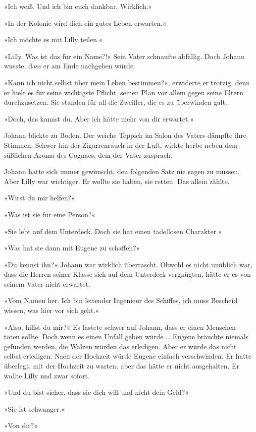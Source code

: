 »Ich weiß. Und ich bin euch dankbar. Wirklich.«

»In der Kolonie wird dich ein gutes Leben erwarten.«

»Ich möchte es mit Lilly teilen.«

»Lilly. Was ist das für ein Name?!« Sein Vater schnaufte abfällig.
Doch Johann wusste, dass er am Ende nachgeben würde.

»Kann ich nicht selbst über mein Leben bestimmen?«, erwiderte er
trotzig, denn er hielt es für seine wichtigste Pflicht, seinen Plan
vor allem gegen seine Eltern durchzusetzen. Sie standen für all die
Zweifler, die es zu überwinden galt.

»Doch, das kannst du. Aber ich hätte mehr von dir erwartet.«

Johann blickte zu Boden. Der weiche Teppich im Salon des Vaters
dämpfte ihre Stimmen. Schwer hin der Zigarrenrauch in der Luft,
wirkte herbe neben dem süßlichen Aroma des Cognacs, dem der Vater
zusprach.

Johann hatte sich immer gewünscht, den folgenden Satz nie sagen zu
müssen. Aber Lilly war wichtiger. Er wollte sie haben, sie retten.
Das allein zählte.

»Wirst du mir helfen?«

»Was ist sie für eine Person?«

»Sie lebt auf dem Unterdeck. Doch sie hat einen tadellosen
Charakter.«

»Was hat sie dann mit Eugene zu schaffen?«

»Du kennst ihn?« Johann war wirklich überrascht. Obwohl es nicht
unüblich war, dass die Herren seiner Klasse sich auf dem Unterdeck
vergnügten, hätte er es von seinem Vater nicht erwartet.

»Vom Namen her. Ich bin leitender Ingenieur des Schiffes, ich muss
Bescheid wissen, was hier vor sich geht.«

»Also, hilfst du mir?« Es lastete schwer auf Johann, dass er einen
Menschen töten sollte. Doch wenn es einen Unfall geben würde \ldots{}
Eugene bräuchte niemals gefunden werden, die Walzen würden das
erledigen. Aber er würde das nicht selbst erledigen. Nach der
Hochzeit würde Eugene einfach verschwinden. Er hatte überlegt, mit
der Hochzeit zu warten, aber das hätte er nicht ausgehalten. Er
wollte Lilly und zwar sofort.

»Und du bist sicher, dass sie dich will und nicht dein Geld?«

»Sie ist schwanger.«

»Von dir?«

